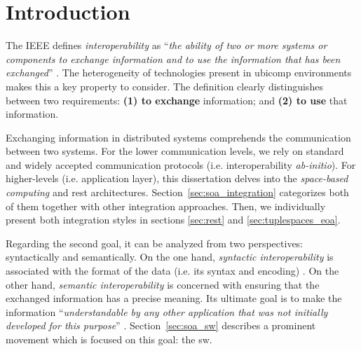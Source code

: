 \section{Introduction}
\label{sec:soa_intro}



The IEEE defines \emph{interoperability} as ``\emph{the ability of two or more systems or components to exchange information and to use the information that has been exchanged}'' \citep{_ieee_1990}.
The heterogeneity of technologies present in \ac{ubicomp} environments makes this a key property to consider.
The definition clearly distinguishes between two requirements: %
\textbf{(1) to exchange} information; and
\textbf{(2) to use} that information. %

\medskip

Exchanging information in distributed systems comprehends the communication between two systems.
For the lower communication levels, we rely on standard and widely accepted communication protocols (i.e. interoperability \emph{ab-initio}). %
For higher-levels (i.e. application layer), this dissertation delves into the \emph{space-based computing} and \ac{rest} architectures.
Section~\ref{sec:soa_integration} categorizes both of them together with other integration approaches.
Then, we individually present both integration styles in sections \ref{sec:rest} and \ref{sec:tuplespaces_eoa}.

\medskip

Regarding the second goal, it can be analyzed from two perspectives: syntactically and semantically.
On the one hand, \emph{syntactic interoperability} is associated with the format of the data (i.e. its syntax and encoding) \citep{van_der_veer_achieving_2006}. %
On the other hand, \emph{semantic interoperability} is concerned with ensuring that the exchanged information has a precise meaning.
Its ultimate goal is to make the information ``\emph{understandable by any other application that was not initially developed for this purpose}'' \citep{_european_2004}.
Section~\ref{sec:soa_sw} describes a prominent movement which is focused on this goal: the \acl{sw}. %





